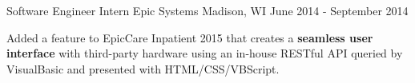 \begin{cventries}
  \cventry
    {Software Engineer Intern} %
    {Epic Systems} %
    {Madison, WI} %
    {June 2014 - September 2014} %
    {
      \begin{cvitems} %
        \item {Added a feature to EpicCare Inpatient 2015 that creates a \textbf{seamless user interface} with third-party hardware using an in-house RESTful API queried by VisualBasic and presented with HTML/CSS/VBScript.}
      \end{cvitems}
    }

\end{cventries}
